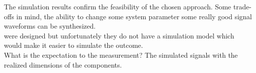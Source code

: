 
The simulation results confirm the feasibility of the chosen approach.
Some trade-offs in mind, the ability to change some system parameter some really good signal waveforms can be synthesized.
\\
were designed but unfortunately they do not have a simulation model which would make it easier to simulate the outcome. \\
What is the expectation to the measurement? 
The simulated signals with the realized dimensions of the components.
